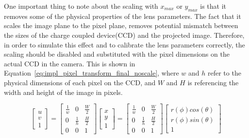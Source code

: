 One important thing to note about the scaling with $x_{max}$ or $y_{max}$ is that it removes some of the physical properties of the lens parameters. The fact that it scales the image plane to the pixel plane, removes potential mismatch between the sizes of the charge coupled device(CCD) and the projected image. Therefore, in order to simulate this effect and to calibrate the lens parameters correctly, the scaling should be disabled and substituted with the pixel dimensions on the actual CCD in the camera. This is shown in Equation~\eqref{eq:impl_pixel_transform_final_noscale}, where $w$ and $h$ refer to the physical dimensions of each pixel on the CCD, and $W$ and $H$ is referencing the width and height of the image in pixels.

\begin{equation}
    \begin{bmatrix}
        u \\ v \\ 1
    \end{bmatrix} = \begin{bmatrix}
        \frac{1}{w} & 0 & \frac{W}{2} \\
        0 & \frac{1}{h} & \frac{H}{2} \\
        0 & 0 & 1
    \end{bmatrix}\begin{bmatrix}
        x \\ y \\ 1
    \end{bmatrix} =
    \begin{bmatrix}
        \frac{1}{w} & 0 & \frac{W}{2} \\
        0 & \frac{1}{h} & \frac{H}{2} \\
        0 & 0 & 1
    \end{bmatrix}\begin{bmatrix}
        r(\phi) cos(\theta) \\ r(\phi) sin(\theta) \\ 1
    \end{bmatrix}
    \label{eq:impl_pixel_transform_final_noscale}
\end{equation}




